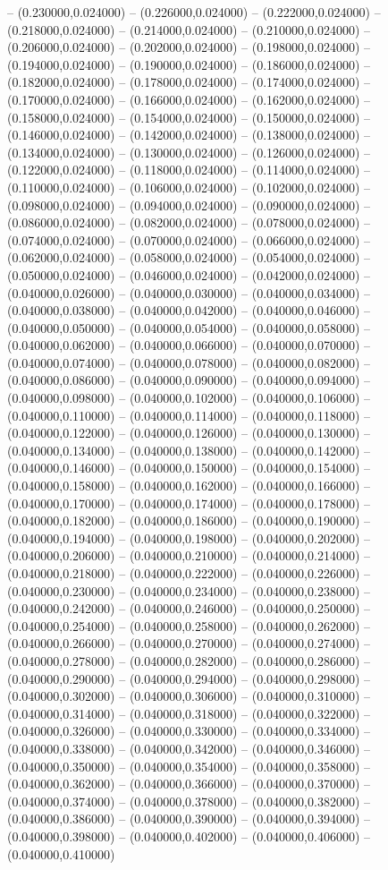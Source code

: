 -- (0.230000,0.024000) -- (0.226000,0.024000) -- (0.222000,0.024000) -- (0.218000,0.024000) -- (0.214000,0.024000) -- (0.210000,0.024000) -- (0.206000,0.024000) -- (0.202000,0.024000) -- (0.198000,0.024000) -- (0.194000,0.024000) -- (0.190000,0.024000) -- (0.186000,0.024000) -- (0.182000,0.024000) -- (0.178000,0.024000) -- (0.174000,0.024000) -- (0.170000,0.024000) -- (0.166000,0.024000) -- (0.162000,0.024000) -- (0.158000,0.024000) -- (0.154000,0.024000) -- (0.150000,0.024000) -- (0.146000,0.024000) -- (0.142000,0.024000) -- (0.138000,0.024000) -- (0.134000,0.024000) -- (0.130000,0.024000) -- (0.126000,0.024000) -- (0.122000,0.024000) -- (0.118000,0.024000) -- (0.114000,0.024000) -- (0.110000,0.024000) -- (0.106000,0.024000) -- (0.102000,0.024000) -- (0.098000,0.024000) -- (0.094000,0.024000) -- (0.090000,0.024000) -- (0.086000,0.024000) -- (0.082000,0.024000) -- (0.078000,0.024000) -- (0.074000,0.024000) -- (0.070000,0.024000) -- (0.066000,0.024000) -- (0.062000,0.024000) -- (0.058000,0.024000) -- (0.054000,0.024000) -- (0.050000,0.024000) -- (0.046000,0.024000) -- (0.042000,0.024000) -- (0.040000,0.026000) -- (0.040000,0.030000) -- (0.040000,0.034000) -- (0.040000,0.038000) -- (0.040000,0.042000) -- (0.040000,0.046000) -- (0.040000,0.050000) -- (0.040000,0.054000) -- (0.040000,0.058000) -- (0.040000,0.062000) -- (0.040000,0.066000) -- (0.040000,0.070000) -- (0.040000,0.074000) -- (0.040000,0.078000) -- (0.040000,0.082000) -- (0.040000,0.086000) -- (0.040000,0.090000) -- (0.040000,0.094000) -- (0.040000,0.098000) -- (0.040000,0.102000) -- (0.040000,0.106000) -- (0.040000,0.110000) -- (0.040000,0.114000) -- (0.040000,0.118000) -- (0.040000,0.122000) -- (0.040000,0.126000) -- (0.040000,0.130000) -- (0.040000,0.134000) -- (0.040000,0.138000) -- (0.040000,0.142000) -- (0.040000,0.146000) -- (0.040000,0.150000) -- (0.040000,0.154000) -- (0.040000,0.158000) -- (0.040000,0.162000) -- (0.040000,0.166000) -- (0.040000,0.170000) -- (0.040000,0.174000) -- (0.040000,0.178000) -- (0.040000,0.182000) -- (0.040000,0.186000) -- (0.040000,0.190000) -- (0.040000,0.194000) -- (0.040000,0.198000) -- (0.040000,0.202000) -- (0.040000,0.206000) -- (0.040000,0.210000) -- (0.040000,0.214000) -- (0.040000,0.218000) -- (0.040000,0.222000) -- (0.040000,0.226000) -- (0.040000,0.230000) -- (0.040000,0.234000) -- (0.040000,0.238000) -- (0.040000,0.242000) -- (0.040000,0.246000) -- (0.040000,0.250000) -- (0.040000,0.254000) -- (0.040000,0.258000) -- (0.040000,0.262000) -- (0.040000,0.266000) -- (0.040000,0.270000) -- (0.040000,0.274000) -- (0.040000,0.278000) -- (0.040000,0.282000) -- (0.040000,0.286000) -- (0.040000,0.290000) -- (0.040000,0.294000) -- (0.040000,0.298000) -- (0.040000,0.302000) -- (0.040000,0.306000) -- (0.040000,0.310000) -- (0.040000,0.314000) -- (0.040000,0.318000) -- (0.040000,0.322000) -- (0.040000,0.326000) -- (0.040000,0.330000) -- (0.040000,0.334000) -- (0.040000,0.338000) -- (0.040000,0.342000) -- (0.040000,0.346000) -- (0.040000,0.350000) -- (0.040000,0.354000) -- (0.040000,0.358000) -- (0.040000,0.362000) -- (0.040000,0.366000) -- (0.040000,0.370000) -- (0.040000,0.374000) -- (0.040000,0.378000) -- (0.040000,0.382000) -- (0.040000,0.386000) -- (0.040000,0.390000) -- (0.040000,0.394000) -- (0.040000,0.398000) -- (0.040000,0.402000) -- (0.040000,0.406000) -- (0.040000,0.410000) 